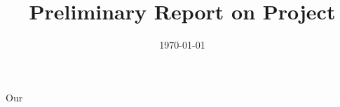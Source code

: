 \documentclass[a4paper]{article}
\begin{document}
\title{Preliminary Report on \GenAI{} Project \PROJNM}
\author{\PROJAUTH}
\date{\today}

\maketitle
\listoftables
\listoffigures
\tableofcontents

\docid{\prelimID}
\docstat{\prelimSTAT}

Our 
\end{document}
